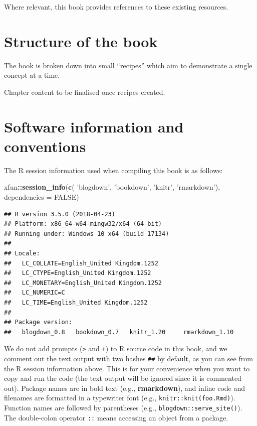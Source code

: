\documentclass[]{book}
\newenvironment{Shaded}{\begin{snugshade}}{\end{snugshade}}
\newcommand{\DataTypeTok}[1]{\textcolor[rgb]{0.13,0.29,0.53}{#1}}
\newcommand{\KeywordTok}[1]{\textcolor[rgb]{0.13,0.29,0.53}{\textbf{#1}}}
\newcommand{\NormalTok}[1]{#1}
\newcommand{\OperatorTok}[1]{\textcolor[rgb]{0.81,0.36,0.00}{\textbf{#1}}}
\newcommand{\OtherTok}[1]{\textcolor[rgb]{0.56,0.35,0.01}{#1}}
\newcommand{\StringTok}[1]{\textcolor[rgb]{0.31,0.60,0.02}{#1}}
\theoremstyle{definition}
\theoremstyle{definition}
\theoremstyle{definition}
\theoremstyle{remark}
\begin{document}
Where relevant, this book provides references to these existing
resources.

\hypertarget{structure-of-the-book}{%
\section*{Structure of the book}\label{structure-of-the-book}}

The book is broken down into small ``recipes'' which aim to demonstrate
a single concept at a time.

Chapter content to be finalised once recipes created.

\hypertarget{software-info}{%
\section*{Software information and conventions}\label{software-info}}

The R session information used when compiling this book is as follows:

\begin{Shaded}
\begin{Highlighting}[]
\NormalTok{xfun}\OperatorTok{::}\KeywordTok{session_info}\NormalTok{(}\KeywordTok{c}\NormalTok{(}
  \StringTok{'blogdown'}\NormalTok{, }\StringTok{'bookdown'}\NormalTok{, }\StringTok{'knitr'}\NormalTok{, }\StringTok{'rmarkdown'}\NormalTok{), }\DataTypeTok{dependencies =} \OtherTok{FALSE}\NormalTok{)}
\end{Highlighting}
\end{Shaded}

\begin{verbatim}
## R version 3.5.0 (2018-04-23)
## Platform: x86_64-w64-mingw32/x64 (64-bit)
## Running under: Windows 10 x64 (build 17134)
## 
## Locale:
##   LC_COLLATE=English_United Kingdom.1252 
##   LC_CTYPE=English_United Kingdom.1252   
##   LC_MONETARY=English_United Kingdom.1252
##   LC_NUMERIC=C                           
##   LC_TIME=English_United Kingdom.1252    
## 
## Package version:
##   blogdown_0.8   bookdown_0.7   knitr_1.20     rmarkdown_1.10
\end{verbatim}

We do not add prompts (\texttt{\textgreater{}} and \texttt{+}) to R
source code in this book, and we comment out the text output with two
hashes \texttt{\#\#} by default, as you can see from the R session
information above. This is for your convenience when you want to copy
and run the code (the text output will be ignored since it is commented
out). Package names are in bold text (e.g., \textbf{rmarkdown}), and
inline code and filenames are formatted in a typewriter font (e.g.,
\texttt{knitr::knit(\textquotesingle{}foo.Rmd\textquotesingle{})}).
Function names are followed by parentheses (e.g.,
\texttt{blogdown::serve\_site()}). The double-colon operator \texttt{::}
means accessing an object from a package.
\end{document}
